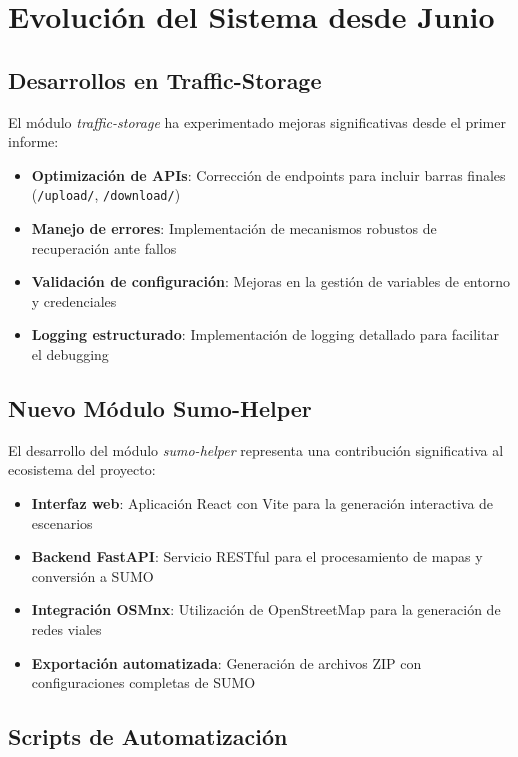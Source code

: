 \documentclass[onecolumn]{article}
\begin{document}
\section{Evolución del Sistema desde Junio}

\subsection{Desarrollos en Traffic-Storage}

El módulo \textit{traffic-storage} ha experimentado mejoras significativas desde el primer informe:

\begin{itemize}
    \item \textbf{Optimización de APIs}: Corrección de endpoints para incluir barras finales (\texttt{/upload/}, \texttt{/download/})
    \item \textbf{Manejo de errores}: Implementación de mecanismos robustos de recuperación ante fallos
    \item \textbf{Validación de configuración}: Mejoras en la gestión de variables de entorno y credenciales
    \item \textbf{Logging estructurado}: Implementación de logging detallado para facilitar el debugging
\end{itemize}

\subsection{Nuevo Módulo Sumo-Helper}

El desarrollo del módulo \textit{sumo-helper} representa una contribución significativa al ecosistema del proyecto:

\begin{itemize}
    \item \textbf{Interfaz web}: Aplicación React con Vite para la generación interactiva de escenarios
    \item \textbf{Backend FastAPI}: Servicio RESTful para el procesamiento de mapas y conversión a SUMO
    \item \textbf{Integración OSMnx}: Utilización de OpenStreetMap para la generación de redes viales
    \item \textbf{Exportación automatizada}: Generación de archivos ZIP con configuraciones completas de SUMO
\end{itemize}

\subsection{Scripts de Automatización}
\end{document}
